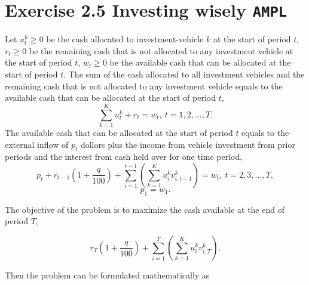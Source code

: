 \section{Exercise 2.5 Investing wisely {\tt AMPL}}

Let $u_{t}^k \geq 0$ be the cash allocated to investment-vehicle $k$ at the start of period $t$, $r_{t} \geq 0$ be the remaining cash that is not allocated to any investment vehicle at the start of period $t$, $w_{t} \geq 0$ be the available cash that can be allocated at the start of period $t$. The sum of the cash allocated to all investment vehicles and the remaining cash that is not allocated to any investment vehicle equals to the available cash that can be allocated at the start of period $t$, $$ \sum_{k=1}^{K} u_{t}^k + r_t = w_t,~t=1,2,...,T.$$ The available cash that can be allocated at the start of period $t$ equals to the external inflow of $p_t$ dollors plus the income from vehicle investment from prior periods and the interest from cash held over for one time period, $$p_t + r_{t-1} (1+\frac{q}{100}) + \sum_{i=1}^{t-1}\left(\sum_{k=1}^K u_{i}^kv_{i,t-1}^k\right) = w_t,~t=2,3,...,T,$$ $$p_1 = w_1.$$

The objective of the problem is to maximize the cash available at the end of period $T$,

$$r_{T} (1+\frac{q}{100}) + \sum_{i=1}^{T}\left(\sum_{k=1}^K u_{i}^kv_{i,T}^k\right).$$

Then the problem can be formulated mathematically as
